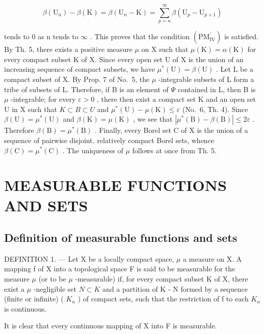 \[
\beta (\mathrm{U} _ {n}) - \beta (\mathrm{K}) = \beta (\mathrm{U} _ {n} - \mathrm{K}) = \sum_ {p = n} ^ {\infty} \beta (\mathrm{U} _ {p} - \mathrm{U} _ {p + 1})
\]

tends to 0 as n tends to \(\infty\) . This proves that the condition \((\mathrm{PM}_{\mathrm{IV}}^{\prime})\) is satisfied. By Th. 5, there exists a positive measure \(\mu\) on X such that \(\mu(\mathrm{K}) = \alpha(\mathrm{K})\) for every compact subset K of X. Since every open set U of X is the union of an increasing sequence of compact subsets, we have \(\mu^{*}(\mathrm{U}) = \beta(\mathrm{U})\) . Let L be a compact subset of X. By Prop. 7 of No.~5, the \(\mu\) -integrable subsets of L form a tribe of subsets of L. Therefore, if B is an element of \(\Psi\) contained in L, then B is \(\mu\) -integrable; for every \(\varepsilon > 0\) , there then exist a compact set K and an open set U in X such that \(K \subset B \subset U\) and \(\mu^{*}(\mathrm{U}) - \mu(\mathrm{K}) \leqslant \varepsilon\) (No.~6, Th. 4). Since \(\beta(\mathrm{U}) = \mu^{*}(\mathrm{U})\) and \(\beta(\mathrm{K}) = \mu(\mathrm{K})\) , we see that \(|\mu^{*}(\mathrm{B}) - \beta(\mathrm{B})| \leqslant 2\varepsilon\) . Therefore \(\beta(\mathrm{B}) = \mu^{*}(\mathrm{B})\) . Finally, every Borel set C of X is the union of a sequence of pairwise disjoint, relatively compact Borel sets, whence \(\beta(\mathrm{C}) = \mu^{*}(\mathrm{C})\) . The uniqueness of \(\mu\) follows at once from Th. 5.

\section{MEASURABLE FUNCTIONS AND SETS}

\subsection{Definition of measurable functions and sets}

DEFINITION 1. --- Let X be a locally compact space, \(\mu\) a measure on X. A mapping f of X into a topological space F is said to be measurable for the measure \(\mu\) (or to be \(\mu\) -measurable) if, for every compact subset K of X, there exist a \(\mu\) -negligible set \(N \subset K\) and a partition of K - N formed by a sequence (finite or infinite) ( \(K_{n}\) ) of compact sets, such that the restriction of f to each \(K_{n}\) is continuous.

It is clear that every continuous mapping of X into F is measurable.

